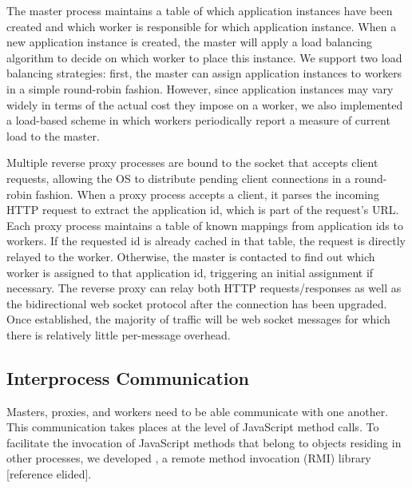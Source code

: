 The master process maintains a table of which application instances have been created and which
worker is responsible for which application instance.  When a new application instance is created,
the master will apply a load balancing algorithm to decide on which worker to place this instance.  
We support two load balancing strategies: first, the master can assign application instances
to workers in a simple round-robin fashion.  However, since application instances may vary
widely in terms of the actual cost they impose on a worker, we also implemented a load-based
scheme in which workers periodically report a measure of current load to the master.

Multiple reverse proxy processes are bound to the socket that accepts client requests, allowing
the OS to distribute pending client connections in a round-robin fashion.  
When a proxy process accepts a client, it parses the incoming HTTP request to extract the application
id, which is part of the request's URL.  Each proxy process maintains a table of known mappings from 
application ids to workers.  If the requested id is already cached in that table, the request is directly
relayed to the worker.  Otherwise, the master is contacted to find out which worker is assigned
to that application id, triggering an initial assignment if necessary.  The reverse proxy can 
relay both HTTP requests/responses as well as the bidirectional web socket protocol after the
connection has been upgraded.  Once established, the majority of traffic will be web socket
messages for which there is relatively little per-message overhead.  


\subsection{Interprocess Communication}
Masters, proxies, and workers need to be able communicate with one another. 
This communication takes places at the level of JavaScript method calls.
To facilitate the invocation of JavaScript methods that belong to objects residing 
in other processes, we developed \nodermi, a remote method invocation (RMI) 
library [reference elided]. %

